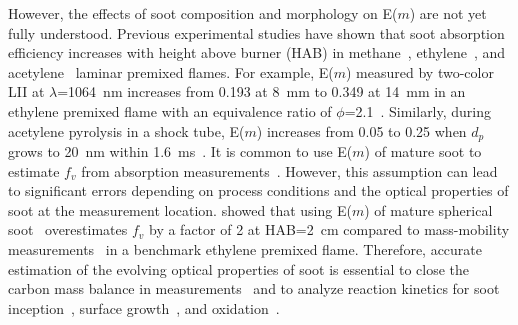 However, the effects of soot composition and morphology on E($m$) are not yet fully understood. Previous experimental studies have shown that soot absorption efficiency increases with height above burner (HAB) in methane~\citep{bejaoui2015measurements}, ethylene~\citep{eremin2020change}, and acetylene~\citep{drakon2021optical} laminar premixed flames. For example, E($m$) measured by two-color LII at $\lambda$=1064~nm increases from 0.193 at 8~mm to 0.349 at 14~mm in an ethylene premixed flame with an equivalence ratio of $\phi$=2.1~\citep{olofsson2015evolution}. Similarly, during acetylene pyrolysis in a shock tube, E($m$) increases from 0.05 to 0.25 when $d_p$ grows to 20~nm within 1.6~ms~\citep{eremin2011size}. It is common to use E($m$) of mature soot to estimate $f_v$ from absorption measurements~\citep{migliorini2011investigation}. However, this assumption can lead to significant errors depending on process conditions and the optical properties of soot at the measurement location. \citet{kelesidis2021determination} showed that using E($m$) of mature spherical soot~\citep{dalzell1969optical} overestimates $f_v$ by a factor of 2 at HAB=2~cm compared to mass-mobility measurements~\citep{camacho2015mobility} in a benchmark ethylene premixed flame. Therefore, accurate estimation of the evolving optical properties of soot is essential to close the carbon mass balance in measurements~\citep{kelesidis2021determination} and to analyze reaction kinetics for soot inception~\citep{kholghy2018reactive}, surface growth~\citep{appel2000kinetic}, and oxidation~\citep{puduppakkam2014soot}.


